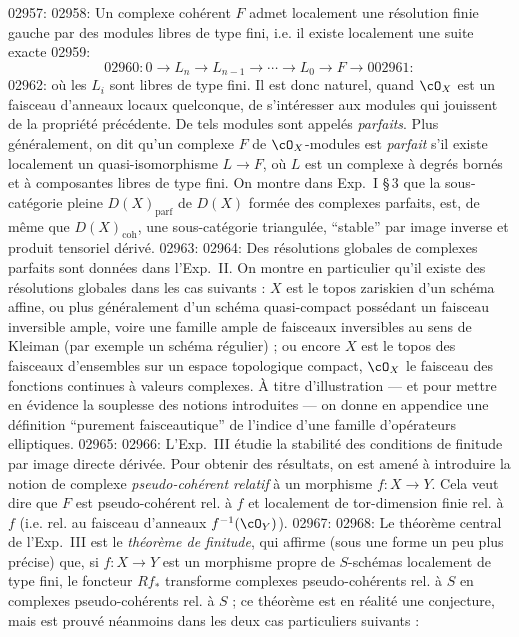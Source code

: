 02957: 
02958: Un complexe coh\'erent $F$ admet localement une r\'esolution finie gauche par des modules libres de type fini, i.e. il existe localement une suite exacte
02959: \[
02960: 0 \longrightarrow L_n \longrightarrow L_{n-1} \longrightarrow \cdots \longrightarrow L_0 \longrightarrow F \longrightarrow 0
02961: \]
02962: o\`u les $L_i$ sont libres de type fini. Il est donc naturel, quand $\cO_X$ est un faisceau d'anneaux locaux quelconque, de s'int\'eresser aux modules qui jouissent de la propri\'et\'e pr\'ec\'edente. De tels modules sont appel\'es \emph{parfaits}. Plus g\'en\'eralement, on dit qu'un complexe $F$ de $\cO_X$-modules est \emph{parfait} s'il existe localement un quasi-isomorphisme $L \to F$, o\`u $L$ est un complexe \`a degr\'es born\'es et \`a composantes libres de type fini. On montre dans Exp.~I \S\,3 que la sous-cat\'egorie pleine $D(X)_{\text{parf}}$ de $D(X)$ form\'ee des complexes parfaits, est, de m\^eme que $D(X)_{\text{coh}}$, une sous-cat\'egorie triangul\'ee, ``stable'' par image inverse et produit tensoriel d\'eriv\'e.
02963: 
02964: Des r\'esolutions globales de complexes parfaits sont donn\'ees dans l'Exp.~II. On montre en particulier qu'il existe des r\'esolutions globales dans les cas suivants : $X$ est le topos zariskien d'un sch\'ema affine, ou plus g\'en\'eralement d'un sch\'ema quasi-compact poss\'edant un faisceau inversible ample, voire une famille ample de faisceaux inversibles au sens de Kleiman (par exemple un sch\'ema r\'egulier) ; ou encore $X$ est le topos des faisceaux d'ensembles sur un espace topologique compact, $\cO_X$ le faisceau des fonctions continues \`a valeurs complexes. \`A titre d'illustration --- et pour mettre en \'evidence la souplesse des notions introduites --- on donne en appendice une d\'efinition ``purement faisceautique'' de l'indice d'une famille d'op\'erateurs elliptiques.
02965: 
02966: L'Exp.~III \'etudie la stabilit\'e des conditions de finitude par image directe d\'eriv\'ee. Pour obtenir des r\'esultats, on est amen\'e \`a introduire la notion de complexe \emph{pseudo-coh\'erent relatif} \`a un morphisme $f : X \to Y$. Cela veut dire que $F$ est pseudo-coh\'erent rel. \`a $f$ et localement de tor-dimension finie rel. \`a $f$ (i.e. rel. au faisceau d'anneaux $f^{-1}(\cO_Y)$).
02967: 
02968: Le th\'eor\`eme central de l'Exp.~III est le \emph{th\'eor\`eme de finitude}, qui affirme (sous une forme un peu plus pr\'ecise) que, si $f : X \to Y$ est un morphisme propre de $S$-sch\'emas localement de type fini, le foncteur $Rf_*$ transforme complexes pseudo-coh\'erents rel. \`a $S$ en complexes pseudo-coh\'erents rel. \`a $S$ ; ce th\'eor\`eme est en r\'ealit\'e une conjecture, mais est prouv\'e n\'eanmoins dans les deux cas particuliers suivants :
